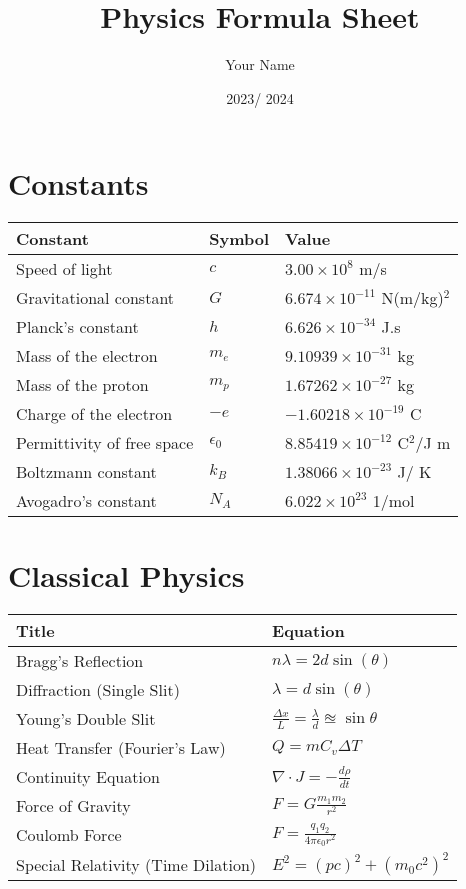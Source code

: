 \documentclass[12pt,a4paper]{article}
\title{Physics Formula Sheet}
\author{Your Name}
\date{2023/ 2024}
\begin{document}
	\maketitle
	
	\section*{Constants}
	\begin{tabular}{lll}
		\toprule
		Constant & Symbol & Value \\
		\midrule
		Speed of light & \( c \) & \( 3.00 \times 10^8 \) m/s \\
		Gravitational constant & \( G \) & \( 6.674 \times 10^{-11} \) N(m/kg)\(^2\) \\
		Planck's constant & \( h \) & \( 6.626 \times 10^{-34} \) J.s \\
		Mass of the electron & \(m_e\) & \(9.10939 \times 10^{-31}\) kg \\
		Mass of the proton & \(m_p\) & \(1.67262 \times 10^{-27}\) kg \\
		Charge of the electron & \(-e\) & \(-1.60218 \times 10^{-19}\) C \\
		Permittivity of free space & \(\epsilon_0\) & \(8.85419 \times 10^{-12}\) C\(^2\)/J m \\
		Boltzmann constant & \(k_B\) & \(1.38066 \times 10^{-23}\) J/ K \\
		Avogadro's constant & \(N_A \) & \( 6.022 \times 10 ^ {23} \) 1/mol\\
		\bottomrule
	\end{tabular}
	
	\section*{Classical Physics}
\begin{tabular}{ll}
	\toprule
	\textbf{Title} & \textbf{Equation} \\
	\midrule
	Bragg's Reflection & \( n \lambda = 2d \sin(\theta) \) \\
	Diffraction (Single Slit) & \( \lambda = d \sin(\theta) \) \\
	Young's Double Slit & \( \frac{\Delta x}{L} = \frac{ \lambda}{d} \approxeq \sin\theta\) \\
	Heat Transfer (Fourier's Law) & \( Q = mC_v \Delta T \) \\
	Continuity Equation & \( \nabla \cdot J = - \frac{d \rho}{dt} \) \\
	Force of Gravity & \( F = G \frac{m_1 m_2}{r^2} \) \\
	Coulomb Force & \( F =  \frac{q_1 q_2}{4 \pi \epsilon_0 r^2} \) \\
	Special Relativity (Time Dilation) & \( E^2 = (pc)^2 + (m_0 c^2)^2 \) \\
	\bottomrule
\end{tabular}
\end{document}
